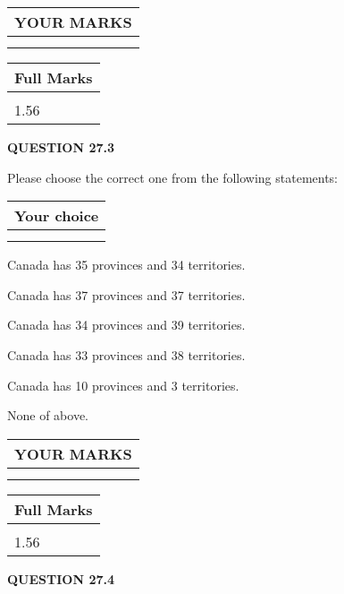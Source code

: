 \documentclass[12pt]{article}
\begin{document}
 
 

 

 
\vspace{0.3in}
  
\vspace{0.2in}
  
\noindent\begin{tabular}{|l|}
\hline
 YOUR MARKS  \\
\hline
 \\ 
 \\ 
\hline
\end{tabular}
\hspace{0.05in} \begin{tabular}{|l|}
\hline
 Full Marks  \\
\hline
 \\ 
1.56 \\
\hline
\end{tabular}
{\textbf{\Large{QUESTION
27.3 
}}}
  
  
Please choose the correct one from the following statements:
  
  
\noindent\hspace{3.0in} \begin{tabular}{|l|}
\hline
Your choice \\
\hline
 \\ 
 \\ 
\hline
\end{tabular}
  
  
 
 
Canada has  %
35 provinces and  %
34 territories.
 
 
Canada has  %
37 provinces and  %
37 territories.
 
 
Canada has  %
34 provinces and  %
39 territories.
 
 
Canada has  %
33 provinces and  %
38 territories.
 
 
Canada has  %
10 provinces and  %
3 territories.
 
 
 None of above.
 
 
  
\vspace{0.2in}
  
\noindent\begin{tabular}{|l|}
\hline
 YOUR MARKS  \\
\hline
 \\ 
 \\ 
\hline
\end{tabular}
\hspace{0.05in} \begin{tabular}{|l|}
\hline
 Full Marks  \\
\hline
 \\ 
1.56 \\
\hline
\end{tabular}
{\textbf{\Large{QUESTION
27.4 
}}}
  
\end{document}
